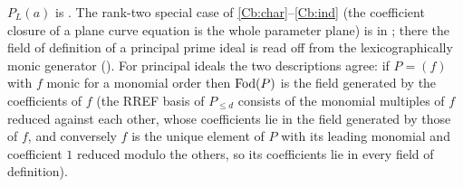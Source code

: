 \begin{leannote}
$P_L(a)$ is .  The
rank-two special case of \ref{Cb:char}--\ref{Cb:ind} (the coefficient closure of a plane
curve equation is the whole parameter plane) is 
in ; there the field of definition of a principal
prime ideal is read off from the lexicographically monic generator
().  For principal ideals the two
descriptions agree: if $P=(f)$ with $f$ monic for a monomial order then
$\operatorname{Fod}(P)$ is the field generated by the coefficients of $f$ (the RREF basis of
$P_{\le d}$ consists of the monomial multiples of $f$ reduced against each other, whose
coefficients lie in the field generated by those of $f$, and conversely $f$ is the
unique element of $P$ with its leading monomial and coefficient $1$ reduced modulo
the others, so its coefficients lie in every field of definition).
\end{leannote}
